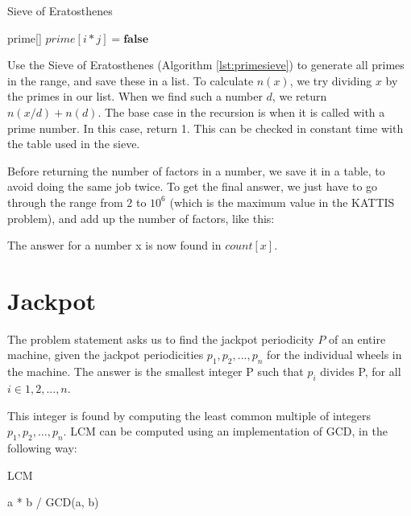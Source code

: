 \documentclass[11pt,a4paper,twoside]{article}
\begin{document}
\begin{algorithm}
    \caption{Sieve of Eratosthenes}
    \label{lst:primesieve}
    \begin{algorithmic}
        \STATE prime[] 
                \STATE $prime[i*j] = \textbf{false}$
            \ENDFOR
        \ENDFOR
    \end{algorithmic}
\end{algorithm}
            
Use the Sieve of Eratosthenes (Algorithm \ref{lst:primesieve}) to generate all
primes in the range, and save these in a list. To calculate $n(x)$, we try
dividing $x$ by the primes in our list. When we find such a number $d$, we
return $n(x/d) + n(d)$. The base case in the recursion is when it is called
with a prime number. In this case, return 1.  This can be checked in constant
time with the table used in the sieve.

    

Before returning the number of factors in a number, we save it in a table, to
avoid doing the same job twice. To get the final answer, we just have to go
through the range from $2$ to $10^6$ (which is the maximum value in the KATTIS
problem), and add up the number of factors, like this:


The answer for a number x is now found in $count[x]$.
\section{Jackpot}

The problem statement asks us to find the jackpot periodicity $P$ of an entire machine, given the jackpot periodicities $p_{1},p_{2},...,p_{n}$ for the individual wheels in the machine. The answer is the smallest integer P such that $p_{i}$ divides P, for all $i \in {1,2,...,n}$.

This integer is found by computing the least common multiple of integers $p_{1},p_{2},...,p_{n}$. LCM can be computed using an implementation of GCD, in the following way:

\begin{algorithm}
    \caption{LCM}
    \label{LCM}
    \begin{algorithmic}
        \STATE a * b / GCD(a, b)
    \end{algorithmic}
\end{algorithm}
\end{document}
